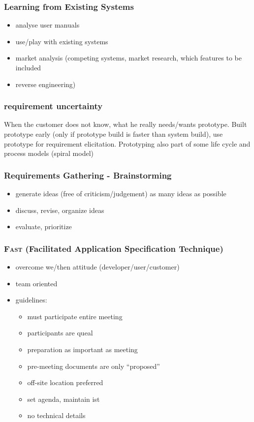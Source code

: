 \documentclass[a4paper, 10pt]{article}
\begin{document}
\subsubsection{Learning from Existing Systems}
\begin{itemize}
	\item analyse user manuals
	\item use/play with existing systems
	\item market analysis (competing systems, market research, which features to be included
	\item reverse engineering)
\end{itemize}

\subsubsection{requirement uncertainty}
When the customer does not know, what he really needs/wants \follows prototype.
Built prototype early (only if prototype build is faster than system build),
use prototype for requirement elicitation.
Prototyping also part of some life cycle and process models (spiral model)

\subsubsection{Requirements Gathering - Brainstorming}
\begin{itemize}
	\item generate ideas (free of criticism/judgement) \follows as many ideas as possible
	\item discuss, revise, organize ideas
	\item evaluate, prioritize
\end{itemize}

\subsubsection{\textsc{Fast} (Facilitated Application Specification Technique)}
\begin{itemize}
	\item overcome we/then attitude (developer/user/customer)
	\item team oriented
	\item guidelines:
		\begin{itemize}
			\item must participate entire meeting
			\item participants are queal
			\item preparation as important as meeting
			\item pre-meeting documents are only ``proposed''
			\item off-site location preferred
			\item set agenda, maintain ist
			\item no technical details
		\end{itemize}
\end{itemize}
\end{document}
